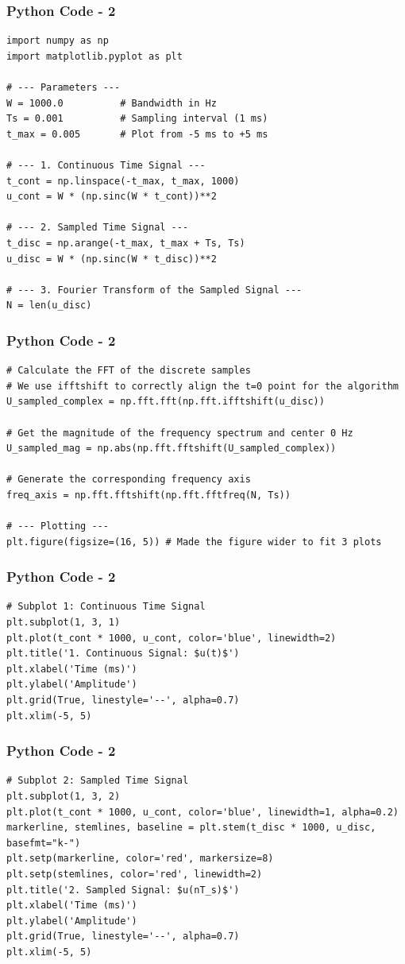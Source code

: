 \documentclass{beamer}
\begin{document}
\begin{frame}[fragile]
    \frametitle{Python Code - 2}
    \begin{lstlisting}
import numpy as np
import matplotlib.pyplot as plt

# --- Parameters ---
W = 1000.0          # Bandwidth in Hz
Ts = 0.001          # Sampling interval (1 ms)
t_max = 0.005       # Plot from -5 ms to +5 ms

# --- 1. Continuous Time Signal ---
t_cont = np.linspace(-t_max, t_max, 1000)
u_cont = W * (np.sinc(W * t_cont))**2

# --- 2. Sampled Time Signal ---
t_disc = np.arange(-t_max, t_max + Ts, Ts)
u_disc = W * (np.sinc(W * t_disc))**2

# --- 3. Fourier Transform of the Sampled Signal ---
N = len(u_disc)

\end{lstlisting}
\end{frame}

\begin{frame}[fragile]
    \frametitle{Python Code - 2}
    \begin{lstlisting}
# Calculate the FFT of the discrete samples
# We use ifftshift to correctly align the t=0 point for the algorithm
U_sampled_complex = np.fft.fft(np.fft.ifftshift(u_disc))

# Get the magnitude of the frequency spectrum and center 0 Hz
U_sampled_mag = np.abs(np.fft.fftshift(U_sampled_complex))

# Generate the corresponding frequency axis
freq_axis = np.fft.fftshift(np.fft.fftfreq(N, Ts))

# --- Plotting ---
plt.figure(figsize=(16, 5)) # Made the figure wider to fit 3 plots

\end{lstlisting}
\end{frame}

\begin{frame}[fragile]
    \frametitle{Python Code - 2}
    \begin{lstlisting}
# Subplot 1: Continuous Time Signal
plt.subplot(1, 3, 1)
plt.plot(t_cont * 1000, u_cont, color='blue', linewidth=2)
plt.title('1. Continuous Signal: $u(t)$')
plt.xlabel('Time (ms)')
plt.ylabel('Amplitude')
plt.grid(True, linestyle='--', alpha=0.7)
plt.xlim(-5, 5)

\end{lstlisting}
\end{frame}

\begin{frame}[fragile]
    \frametitle{Python Code - 2}
    \begin{lstlisting}
# Subplot 2: Sampled Time Signal
plt.subplot(1, 3, 2)
plt.plot(t_cont * 1000, u_cont, color='blue', linewidth=1, alpha=0.2)
markerline, stemlines, baseline = plt.stem(t_disc * 1000, u_disc, basefmt="k-")
plt.setp(markerline, color='red', markersize=8)
plt.setp(stemlines, color='red', linewidth=2)
plt.title('2. Sampled Signal: $u(nT_s)$')
plt.xlabel('Time (ms)')
plt.ylabel('Amplitude')
plt.grid(True, linestyle='--', alpha=0.7)
plt.xlim(-5, 5)


\end{lstlisting}
\end{frame}
\end{document}
